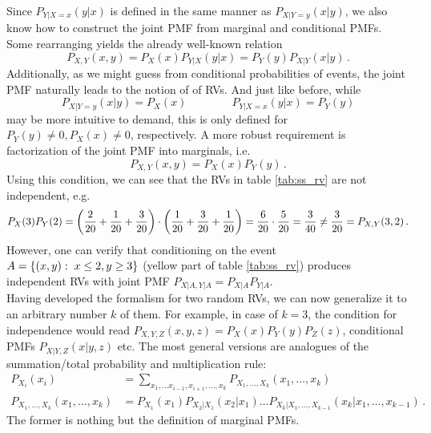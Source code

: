 Since $P_{Y | X = x}(y | x)$ is defined in the same manner as $P_{X | Y = y}(x | y)$, we also know how to construct the joint PMF from marginal and conditional PMFs. Some rearranging yields the already well-known relation
\begin{equation}\label{eq:joint_pmf}
P_{X, Y}(x, y) =  P_X(x) P_{Y | X}(y | x) = P_Y(y) P_{X | Y}(x | y) \, .
\end{equation}
Additionally, as we might guess from conditional probabilities of events, the joint PMF naturally leads to the notion of  of RVs. And just like before, while
\begin{equation}
P_{X | Y = y}(x | y) = P_X(x) \qquad \qquad P_{Y | X = x}(y | x) = P_Y(y)
\end{equation}
may be more intuitive to demand, this is only defined for $P_Y(y) \neq 0, P_X(x) \neq 0$, respectively. A more robust requirement is factorization of the joint PMF into marginals, i.e.
\begin{equation}
P_{X, Y}(x, y) = P_X(x) P_Y(y) \, .
\end{equation}
Using this condition, we can see that the RVs in table \ref{tab:ss_rv} are not independent, e.g.
\begin{equation*}
P_X(3) P_Y(2) = \qty(\frac{2}{20} + \frac{1}{20} + \frac{3}{20}) \cdot \qty(\frac{1}{20} + \frac{3}{20} + \frac{1}{20}) = \frac{6}{20} \cdot \frac{5}{20} = \frac{3}{40} \neq \frac{3}{20} = P_{X, Y}(3, 2) \, .
\end{equation*}
However, one can verify that conditioning on the event $A = \qty{(x, y): \; x \leq 2, y \geq 3}$ (yellow part of table \ref{tab:ss_rv}) produces independent RVs with joint PMF $P_{X | A, Y | A} = P_{X | A} P_{Y | A}$.\\


Having developed the formalism for two random RVs, we can now generalize it to an arbitrary number $k$ of them. For example, in case of $k = 3$, the condition for independence would read $P_{X, Y, Z}(x, y, z) = P_X(x) P_Y(y) P_Z(z)$, conditional PMFs $P_{X | Y, Z}(x | y, z)$ etc. The most general versions are analogues of the summation/total probability and multiplication rule:
\begin{align}
P_{X_i}(x_i) &= \sum_{x_1, \dots x_{i - 1}, x_{i + 1}, \dots, x_k} P_{X_1, \dots, X_k}(x_1, \dots, x_k)
\\
P_{X_1, \dots, X_k}(x_1, \dots, x_k) &= P_{X_1}(x_1) P_{X_2 | X_1}(x_2 | x_1) \dots P_{X_k | X_1, \dots, X_{k - 1}}(x_k | x_1, \dots, x_{k - 1}) \, .
\end{align}
The former is nothing but the definition of marginal PMFs.



